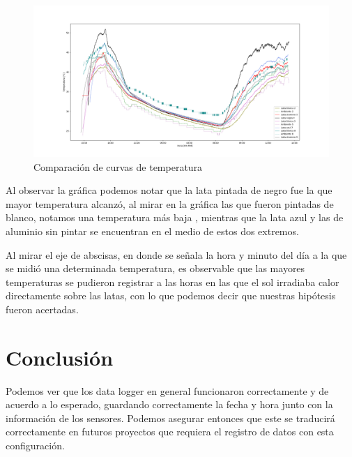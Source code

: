 \documentclass[11pt,twocolumn,letterpaper,spanish]{article}
\begin{document}
\begin{figure}[hbt!]
   \centering
   \includegraphics[width = 18 cm]{Imagenes/curvas}
   \caption{Comparación de curvas de temperatura}
\end{figure}

Al observar la gráfica podemos notar que la lata pintada de negro fue la que mayor temperatura alcanzó, al mirar en la gráfica las que fueron pintadas de blanco, notamos una temperatura más baja , mientras que la lata azul y las de aluminio sin pintar se encuentran en el medio de estos dos extremos.

Al mirar el eje de abscisas, en donde se señala la hora y minuto del día a la que se midió una determinada temperatura, es observable que las mayores temperaturas se pudieron registrar a las horas en las que el sol irradiaba calor directamente sobre las latas, con lo que podemos decir que nuestras hipótesis fueron acertadas.


\section*{Conclusión}

Podemos ver que los data logger en general funcionaron correctamente y de acuerdo a lo esperado, guardando correctamente la fecha y hora junto con la información de los sensores. Podemos asegurar entonces que este se traducirá correctamente en futuros proyectos que requiera el registro de datos con esta configuración.




\end{document}
